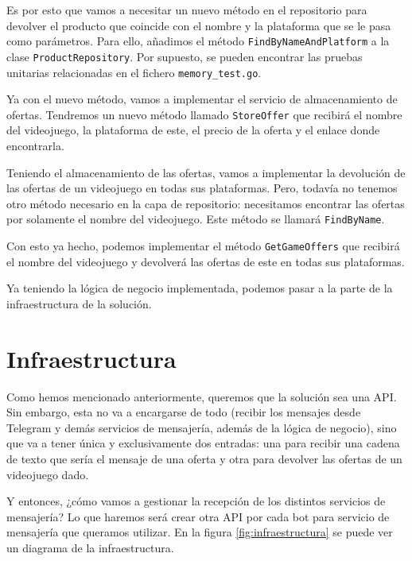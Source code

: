 Es por esto que vamos a necesitar un nuevo método en el repositorio para devolver 
el producto que coincide con el nombre y la plataforma que se le pasa como 
parámetros. Para ello, añadimos el método \verb|FindByNameAndPlatform| a la clase 
\verb|ProductRepository|. Por supuesto, se pueden encontrar las pruebas unitarias 
relacionadas en el fichero \verb|memory_test.go|.

Ya con el nuevo método, vamos a implementar el servicio de almacenamiento de 
ofertas. Tendremos un nuevo método llamado \verb|StoreOffer| que recibirá el nombre 
del videojuego, la plataforma de este, el precio de la oferta y el enlace donde 
encontrarla.

Teniendo el almacenamiento de las ofertas, vamos a implementar la devolución de las 
ofertas de un videojuego en todas sus plataformas. Pero, todavía no tenemos otro 
método necesario en la capa de repositorio: necesitamos encontrar las ofertas por 
solamente el nombre del videojuego. Este método se llamará \verb|FindByName|.

Con esto ya hecho, podemos implementar el método \verb|GetGameOffers| que recibirá 
el nombre del videojuego y devolverá las ofertas de este en todas sus plataformas.

Ya teniendo la lógica de negocio implementada, podemos pasar a la parte de la 
infraestructura de la solución.

\section{Infraestructura}

Como hemos mencionado anteriormente, queremos que la solución sea una API. Sin 
embargo, esta no va a encargarse de todo (recibir los mensajes desde Telegram y 
demás servicios de mensajería, además de la lógica de negocio), sino que va a tener 
única y exclusivamente dos entradas: una para recibir una cadena de texto que sería 
el mensaje de una oferta y otra para devolver las ofertas de un videojuego dado.

Y entonces, ¿cómo vamos a gestionar la recepción de los distintos servicios de 
mensajería? Lo que haremos será crear otra API por cada bot para servicio de 
mensajería que queramos utilizar. En la figura \ref{fig:infraestructura} se puede 
ver un diagrama de la infraestructura.

